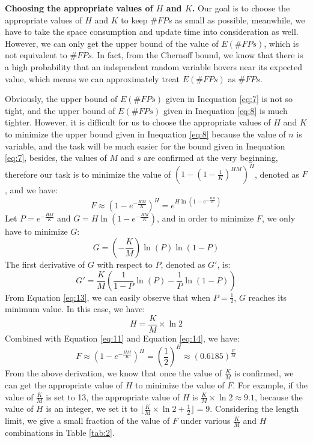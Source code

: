 \documentclass[conference]{IEEEtran}
\begin{document}
\textbf{Choosing the appropriate values of $H$ and $K$.}
Our goal is to choose the appropriate values of $H$ and $K$ to keep $\#FPs$ as small as possible, meanwhile, we have to take the space consumption and update time into consideration as well. However, we can only get the upper bound of the value of $E(\#FPs)$, which is not equivalent to $\#FPs$. In fact, from the Chernoff bound, we know that there is a high probability that an independent random variable hovers near its expected value, which means we can approximately treat $E(\#FPs)$ as $\#FPs$.\par
Obviously, the upper bound of $E(\#FPs)$ given in Inequation \ref{eq:7} is not so tight, and the upper bound of $E(\#FPs)$ given in Inequation \ref{eq:8} is much tighter. However, it is difficult for us to choose the appropriate values of $H$ and $K$ to minimize the upper bound given in Inequation \ref{eq:8} because the value of $n$ is variable, and the task will be much easier for the bound given in Inequation \ref{eq:7}, besides, the values of $M$ and $s$ are confirmed at the very beginning, therefore our task is to minimize the value of $(1-(1-\frac{1}{K})^{HM})^H$, denoted as $F$, and we have:
\begin{equation}\label{eq:11}
F\approx(1-e^{-\frac{HM}{K}})^H=e^{H\ln (1-e^{-\frac{HM}{K}})}
\end{equation}
Let $P=e^{-\frac{HM}{K}}$ and $G=H\ln (1-e^{-\frac{HM}{K}})$, and in order to minimize $F$, we only have to minimize $G$:
\begin{equation}\label{eq:12}
G=(-\frac{K}{M})\ln(P)\ln(1-P)
\end{equation}
The first derivative of $G$ with respect to $P$, denoted as $G'$, is:
\begin{equation}\label{eq:13}
G'=\frac{K}{M}(\frac{1}{1-P}\ln(P)-\frac{1}{P}\ln(1-P))
\end{equation}
From Equation \ref{eq:13}, we can easily observe that when $P=\frac{1}{2}$, $G$ reaches its minimum value. In this case, we have:
\begin{equation}\label{eq:14}
H=\frac{K}{M}\times\ln 2
\end{equation}
Combined with Equation \ref{eq:11} and Equation \ref{eq:14}, we have:
\begin{equation}\label{eq:15}
F\approx(1-e^{-\frac{HM}{K}})^H=(\frac{1}{2})^H\approx(0.6185)^{\frac{K}{M}}
\end{equation}
From the above derivation, we know that once the value of $\frac{K}{M}$ is confirmed, we can get the appropriate value of $H$ to minimize the value of $F$. For example, if the value of $\frac{K}{M}$ is set to 13, the appropriate value of $H$ is $\frac{K}{M}\times\ln 2\approx9.1$, because the value of $H$ is an integer, we set it to $\lfloor\frac{K}{M}\times\ln 2+\frac{1}{2}\rfloor=9$. Considering the length limit, we give a small fraction of the value of $F$ under various $\frac{K}{M}$ and $H$ combinations in Table \ref{tab:2}.\par
\end{document}
